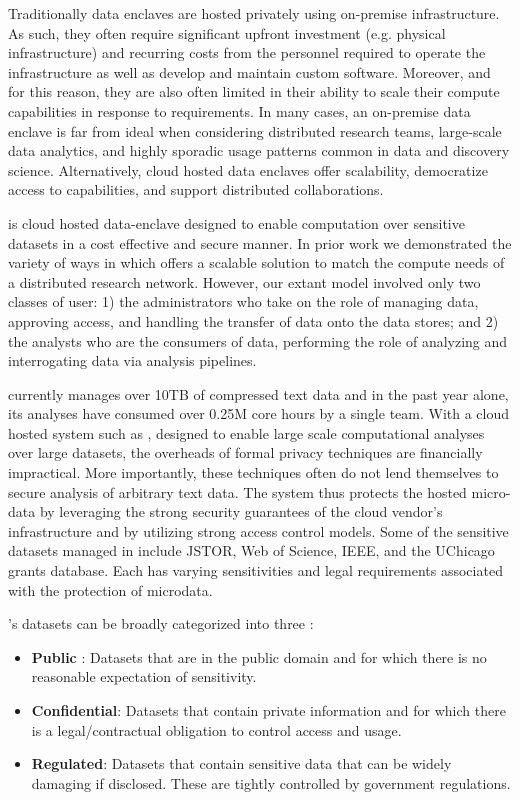Traditionally data enclaves are hosted privately using on-premise infrastructure. As
such, they often require significant upfront investment (e.g. physical infrastructure) and recurring costs 
from the personnel required to operate the infrastructure as well as develop and maintain custom software. 
Moreover, and for this reason, they are also often limited in their ability to scale their
compute capabilities in response to requirements. In many cases, an on-premise data enclave is far from ideal
when considering distributed research teams, large-scale data analytics, and highly sporadic
usage patterns common in data and discovery science. Alternatively, cloud hosted data enclaves offer scalability,
democratize access to capabilities, and support distributed collaborations. 

\NAME is cloud hosted data-enclave designed to enable computation over sensitive datasets
in a cost effective and secure manner. In prior work we demonstrated the variety of ways in which \NAME offers
a scalable solution to match the compute needs of a distributed research network. 
However, our extant model involved only two classes of user: 1) the administrators who take on the role of managing
data, approving access, and handling the transfer of data onto the data stores; and 2) the analysts
who are the consumers of data, performing the role of analyzing and interrogating data
via analysis pipelines.

\NAME currently manages over 10TB of compressed text data and in the past year
alone, its analyses have consumed over 0.25M core hours by a single team. With a cloud hosted system
such as \NAMENS, designed to enable large scale computational analyses over large datasets,
the overheads of formal privacy techniques are financially impractical. More importantly,
these techniques often do not lend themselves to secure analysis of arbitrary text data. 
The system thus protects the hosted micro-data by leveraging the strong security
guarantees of the cloud vendor's infrastructure and by utilizing strong access control
models. Some of the sensitive datasets managed in \NAME include JSTOR, Web of Science, IEEE,
and the UChicago grants database. Each has varying sensitivities and legal requirements associated with the
protection of microdata.

\NAMENS's datasets can be broadly categorized into three \cite{ist_dataclass}:
\begin{itemize}
\item \textbf{Public} : Datasets that are in the public domain and for which there is no
  reasonable expectation of sensitivity.
\item \textbf{Confidential}: Datasets that contain private information and for which there is a legal/contractual obligation to control access and usage.
\item \textbf {Regulated}: Datasets that contain sensitive data that can be widely damaging if disclosed.
  These are tightly controlled by government regulations.
\end{itemize}

